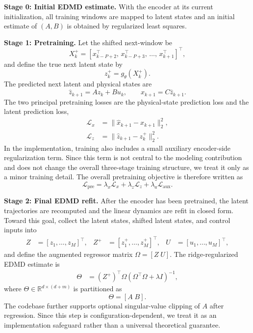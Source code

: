 \documentclass[journal]{IEEEtran}
\begin{document}
\textbf{Stage 0: Initial EDMD estimate.} With the encoder at its current initialization, all training windows are mapped to latent states and an initial estimate of $(A,B)$ is obtained by regularized least squares.

\textbf{Stage 1: Pretraining.} Let the shifted next-window be
\begin{equation}
    X_k^{+} = [x_{k-P+2}^\top,\,x_{k-P+3}^\top,\,\ldots,\,x_{k+1}^\top]^\top,
\end{equation}
and define the true next latent state by
\begin{equation}
    z_k^{+} = g_\theta(X_k^{+}).
\end{equation}
The predicted next latent and physical states are
\begin{equation}
    \hat{z}_{k+1} = Az_k + Bu_k,
    \qquad
    \hat{x}_{k+1} = C\hat{z}_{k+1}.
\end{equation}
The two principal pretraining losses are the physical-state prediction loss and the latent prediction loss,
\begin{align}
    \mathcal{L}_{x} &= \|\hat{x}_{k+1}-x_{k+1}\|_2^2,
    \\
    \mathcal{L}_{z} &= \|\hat{z}_{k+1}-z_k^{+}\|_2^2.
\end{align}
In the implementation, training also includes a small auxiliary encoder-side regularization term. Since this term is not central to the modeling contribution and does not change the overall three-stage training structure, we treat it only as a minor training detail. The overall pretraining objective is therefore written as
\begin{equation}
    \mathcal{L}_{\mathrm{pre}} = \lambda_x\mathcal{L}_x + \lambda_z\mathcal{L}_z + \lambda_a\mathcal{L}_{\mathrm{aux}}.
    \label{eq:pretraining_loss}
\end{equation}

\textbf{Stage 2: Final EDMD refit.} After the encoder has been pretrained, the latent trajectories are recomputed and the linear dynamics are refit in closed form. Toward this goal, collect the latent states, shifted latent states, and control inputs into
\begin{align}
    Z &= [z_1,\ldots,z_M]^\top, &
    Z^{+} &= [z_1^{+},\ldots,z_M^{+}]^\top, &
    U &= [u_1,\ldots,u_M]^\top,
\end{align}
and define the augmented regressor matrix $\Omega=[Z\;U]$. The ridge-regularized EDMD estimate is
\begin{equation}
\begin{aligned}
    \Theta &= (Z^{+})^\top \Omega
    \left(\Omega^\top\Omega + \lambda I\right)^{-1},
\end{aligned}
    \label{eq:edmd_solution}
\end{equation}
where $\Theta \in \mathbb{R}^{d\times(d+m)}$ is partitioned as
\begin{equation}
    \Theta = [A\;B].
\end{equation}
The codebase further supports optional singular-value clipping of $A$ after regression. Since this step is configuration-dependent, we treat it as an implementation safeguard rather than a universal theoretical guarantee.
\end{document}
